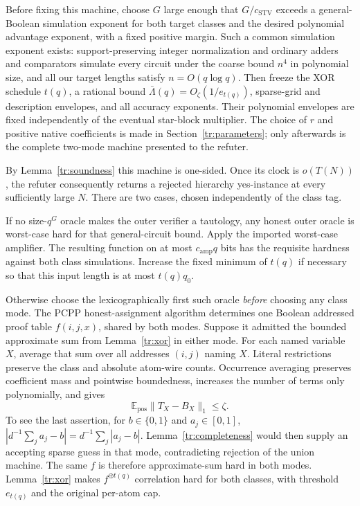 \documentclass[11pt,letterpaper]{article}
\theoremstyle{definition}
\theoremstyle{remark}
\begin{document}
Before fixing this machine, choose $G$ large enough that
$G/c_{\mathrm{STV}}$ exceeds a general-Boolean simulation exponent
for both target classes and the desired polynomial advantage exponent,
with a fixed positive margin. Such a common simulation exponent exists:
support-preserving integer normalization and ordinary adders and
comparators simulate every circuit under the coarse bound $n^4$ in
polynomial size, and all our target lengths satisfy $n=O(q\log q)$.
Then freeze the XOR schedule $t(q)$, a rational bound
$\bar\Lambda(q)=O_\zeta(1/e_{t(q)})$, sparse-grid and description
envelopes, and all accuracy exponents. Their polynomial envelopes are
fixed independently of the eventual star-block multiplier.
The choice of $r$ and positive native coefficients is made in
Section~\ref{tr:parameters}; only afterwards is the complete two-mode
machine presented to the refuter.

By Lemma~\ref{tr:soundness} this machine is one-sided. Once its clock
is $o(T(N))$, the refuter consequently returns a rejected hierarchy
yes-instance at every sufficiently large $N$.
There are two cases, chosen independently of the class tag.

If no size-$q^G$ oracle makes the outer verifier a tautology, any honest
outer oracle is worst-case hard for that general-circuit bound.
Apply the imported worst-case amplifier. The resulting function on at
most $c_{\mathrm{amp}}q$ bits has the requisite hardness against both
class simulations. Increase the fixed minimum of $t(q)$ if necessary
so that this input length is at most $t(q)q_0$.

Otherwise choose the lexicographically first such oracle \emph{before}
choosing any class mode. The PCPP honest-assignment algorithm determines
one Boolean addressed proof table $f(i,j,x)$, shared by both modes.
Suppose it admitted the bounded approximate sum from
Lemma~\ref{tr:xor} in either mode. For each named variable $X$, average
that sum over all addresses $(i,j)$ naming $X$.
Literal restrictions preserve the class and absolute atom-wire counts.
Occurrence averaging preserves coefficient mass and pointwise
boundedness, increases the number of terms only polynomially, and gives
\[
 \mathbb E_{\mathrm{pos}}\|T_X-B_X\|_1\le\zeta.
\]
To see the last assertion, for $b\in\{0,1\}$ and $a_j\in[0,1]$,
$|d^{-1}\sum_j a_j-b|=d^{-1}\sum_j|a_j-b|$.
Lemma~\ref{tr:completeness} would then supply an accepting sparse guess
in that mode, contradicting rejection of the union machine.
The same $f$ is therefore approximate-sum hard in both modes.
Lemma~\ref{tr:xor} makes $f^{\oplus t(q)}$ correlation hard for
both classes, with threshold $e_{t(q)}$ and the original per-atom cap.
\end{document}
